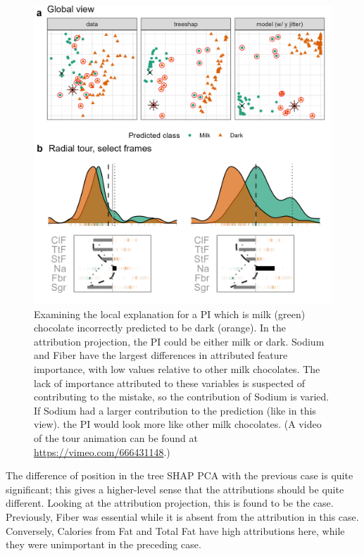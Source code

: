 \documentclass[11pt,twoside]{article}
\begin{document}
\begin{figure}

{\centering \includegraphics[width=1\linewidth]{./figures/case_chocolates_inverse} 

}

\caption{Examining the local explanation for a PI which is milk (green) chocolate incorrectly predicted to be dark (orange). In the attribution projection, the PI could be either milk or dark. Sodium and Fiber have the largest differences in attributed feature importance, with low values relative to other milk chocolates. The lack of importance attributed to these variables is suspected of contributing to the mistake, so the contribution of Sodium is varied. If Sodium had a larger contribution to the prediction (like in this view). the PI would look more like other milk chocolates. (A video of the tour animation can be found at \url{https://vimeo.com/666431148}.)}\label{fig:casechocolatesinverse}
\end{figure}

The difference of position in the tree SHAP PCA with the previous case is quite significant; this gives a higher-level sense that the attributions should be quite different. Looking at the attribution projection, this is found to be the case. Previously, Fiber was essential while it is absent from the attribution in this case. Conversely, Calories from Fat and Total Fat have high attributions here, while they were unimportant in the preceding case.
\end{document}
